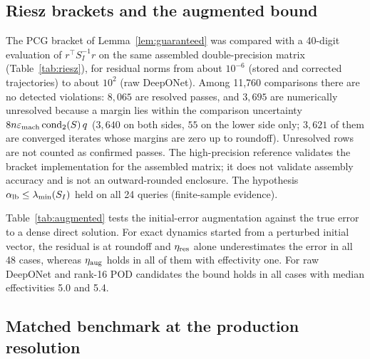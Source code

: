 \documentclass[11pt]{amsart}
\theoremstyle{remark}
\begin{document}


\subsection{Riesz brackets and the augmented bound}
\label{ssec:bracket-results}

The PCG bracket of Lemma~\ref{lem:guaranteed} was compared with a 40-digit
evaluation of $r^\top S_I^{-1}r$ on the same assembled double-precision
matrix (Table~\ref{tab:riesz}), for residual norms from about $10^{-6}$
(stored and corrected trajectories) to about $10^{2}$ (raw DeepONet).
Among 11{,}760 comparisons there are no detected violations: $8{,}065$ are
resolved passes, and $3{,}695$ are numerically unresolved because a margin
lies within the comparison uncertainty $8n\varepsilon_{\rm mach}\,
\mathrm{cond}_2(S)\,q$ ($3{,}640$ on both sides, $55$ on the lower side
only; $3{,}621$ of them are converged iterates whose margins are zero up to
roundoff). Unresolved rows are not counted as confirmed passes. The
high-precision reference validates the bracket implementation for the
assembled matrix; it does not validate assembly accuracy and is not an
outward-rounded enclosure. The hypothesis $\alpha_{\rm lb}\le\lambda_{\min}(S_I)$
held on all 24 queries (finite-sample evidence).

Table~\ref{tab:augmented} tests the initial-error augmentation against the
true error to a dense direct solution. For exact dynamics started from a
perturbed initial vector, the residual is at roundoff and $\eta_{\rm res}$
alone underestimates the error in all 48 cases, whereas $\eta_{\rm aug}$
holds in all of them with effectivity one. For raw DeepONet and rank-16
POD candidates the bound holds in all cases with median effectivities 5.0
and 5.4.




\subsection{Matched benchmark at the production resolution}
\label{ssec:benchmark}
\end{document}
